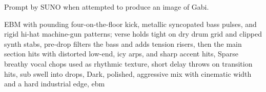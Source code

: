
\begin{notes}
Prompt by SUNO when attempted to produce an image of Gabi.
\end{notes}
\begin{prompt}
EBM with pounding four-on-the-floor kick, metallic syncopated bass pulses, and rigid hi-hat machine-gun patterns; verse holds tight on dry drum grid and clipped synth stabs, pre-drop filters the bass and adds tension risers, then the main section hits with distorted low-end, icy arps, and sharp accent hits, Sparse breathy vocal chops used as rhythmic texture, short delay throws on transition hits, sub swell into drops, Dark, polished, aggressive mix with cinematic width and a hard industrial edge, ebm
\end{prompt}

